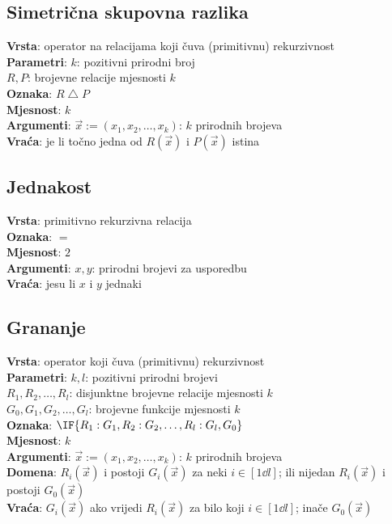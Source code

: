 \subsection{Simetrična skupovna razlika}
\textbf{Vrsta}: operator na relacijama koji čuva (primitivnu) rekurzivnost\\
\textbf{Parametri}: $k$: pozitivni prirodni broj\\
$R,P$: brojevne relacije mjesnosti $k$\\
\textbf{Oznaka}: $R\mathbin{\triangle}P$\\
\textbf{Mjesnost}: $k$\\
\textbf{Argumenti}: $\vec x:=(x_1,x_2,\dots,x_k)$: $k$ prirodnih brojeva\\
\textbf{Vraća}: je li točno jedna od $R(\vec x)$ i $P(\vec x)$ istina

\subsection{Jednakost}
\textbf{Vrsta}: primitivno rekurzivna relacija\\
\textbf{Oznaka}: $=$\\
\textbf{Mjesnost}: $2$\\
\textbf{Argumenti}: $x,y$: prirodni brojevi za usporedbu\\
\textbf{Vraća}: jesu li $x$ i $y$ jednaki

\subsection{Grananje}
\textbf{Vrsta}: operator koji čuva (primitivnu) rekurzivnost\\
\textbf{Parametri}: $k,l$: pozitivni prirodni brojevi\\
$R_1,R_2,\dots,R_l$: disjunktne brojevne relacije mjesnosti $k$\\
$G_0,G_1,G_2,\dots,G_l$: brojevne funkcije mjesnosti $k$\\
\textbf{Oznaka}: $\IF{R_1:G_1,R_2:G_2,\dots,R_l:G_l,G_0}$\\
\textbf{Mjesnost}: $k$\\
\textbf{Argumenti}: $\vec x:=(x_1,x_2,\dots,x_k)$: $k$ prirodnih brojeva\\
\textbf{Domena}: $R_i(\vec x)$ i postoji $G_i(\vec x)$ za neki $i\in[1\dd l]$; ili nijedan $R_i(\vec x)$ i postoji $G_0(\vec x)$\\
\textbf{Vraća}: $G_i(\vec x)$ ako vrijedi $R_i(\vec x)$ za bilo koji $i\in[1\dd l]$; inače $G_0(\vec x)$

